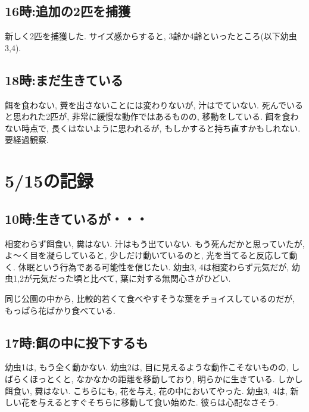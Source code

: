 \documentclass{jsarticle}
\begin{document}
\subsection{16時:追加の2匹を捕獲}
新しく2匹を捕獲した. サイズ感からすると, 3齢か4齢といったところ(以下幼虫3,4). 

\subsection{18時:まだ生きている}
餌を食わない, 糞を出さないことには変わりないが, 汁はでていない. 
死んでいると思われた2匹が, 非常に緩慢な動作ではあるものの, 移動をしている. 
餌を食わない時点で, 長くはないように思われるが, もしかすると持ち直すかもしれない. 要経過観察. 

\section{5/15の記録}
\subsection{10時:生きているが・・・}
相変わらず餌食い, 糞はない. 汁はもう出ていない.
もう死んだかと思っていたが, よ〜く目を凝らしていると, 少しだけ動いているのと, 
光を当てると反応して動く. 休眠という行為である可能性を信じたい. 
幼虫3, 4は相変わらず元気だが, 幼虫1,2が元気だった頃と比べて, 葉に対する無関心さがひどい. 

同じ公園の中から, 比較的若くて食べやすそうな葉をチョイスしているのだが, もっぱら花ばかり食べている. 

\subsection{17時:餌の中に投下するも}
幼虫1は, もう全く動かない. 幼虫2は, 目に見えるような動作こそないものの, 
しばらくほっとくと, なかなかの距離を移動しており, 明らかに生きている. しかし餌食い, 糞はない. 
こちらにも, 花を与え, 花の中においてやった. 
幼虫3, 4は, 新しい花を与えるとすぐそちらに移動して食い始めた. 彼らは心配なさそう. 
\end{document}
